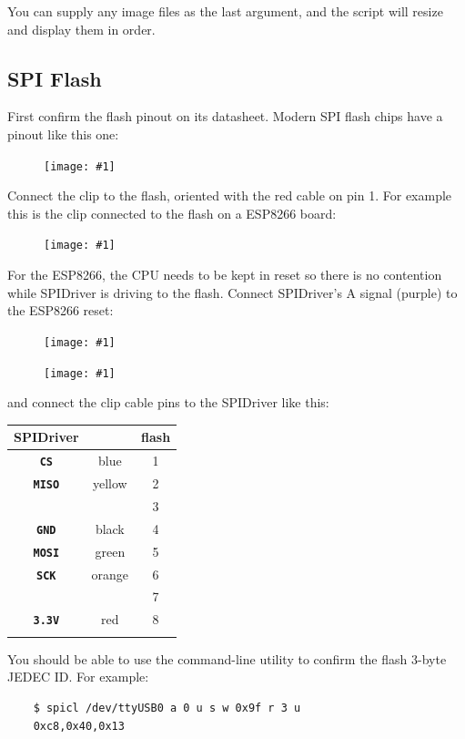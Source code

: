 \documentclass{article}
\newcommand{\png}[1]{
\begin{figure}[H]
\begin{center}
\texttt{[image: \#1]}
\end{center}
\end{figure}
}
\newcommand{\mach}[1]{\texttt{\textbf{#1}}}
\newcommand{\gap}{\vspace{10pt}}
\begin{document}
You can supply any image files as the last argument,
and the script will resize and display them in order.

\subsection{SPI Flash}

First confirm the flash pinout on its datasheet. Modern SPI flash chips have a pinout like this one:

\png{img/spidriver/spidriver-flash-0}

Connect the clip to the flash, oriented with the red cable on pin 1.
For example this is the clip connected to the flash on a ESP8266 board:

\png{img/spidriver/spidriver-esp1}

 
 For the ESP8266, the CPU needs to be kept in reset so there is no contention while SPIDriver is driving to the flash.
 Connect SPIDriver's A signal (purple) to the ESP8266 reset:
 
\png{img/spidriver/spidriver-esp2}

\png{img/spidriver/spidriver-flash-2}

and connect the clip cable pins to the SPIDriver like this:

\begin{center}
\gap\begin{tabular}{ccc}
\hline
SPIDriver&        & flash   \\
\hline
\mach{CS}         & blue   & 1 \\
\mach{MISO}       & yellow & 2 \\
                  &        & 3 \\
\mach{GND}        & black  & 4 \\
\mach{MOSI}       & green  & 5 \\
\mach{SCK}        & orange & 6 \\
                  &        & 7 \\
\mach{3.3V}       & red    & 8 \\
\hline \\
\end{tabular}
\end{center}

You should be able to use the command-line utility to confirm the flash 3-byte JEDEC ID.
For example:

\begin{lstlisting}
    $ spicl /dev/ttyUSB0 a 0 u s w 0x9f r 3 u
    0xc8,0x40,0x13
\end{lstlisting}
\end{document}
